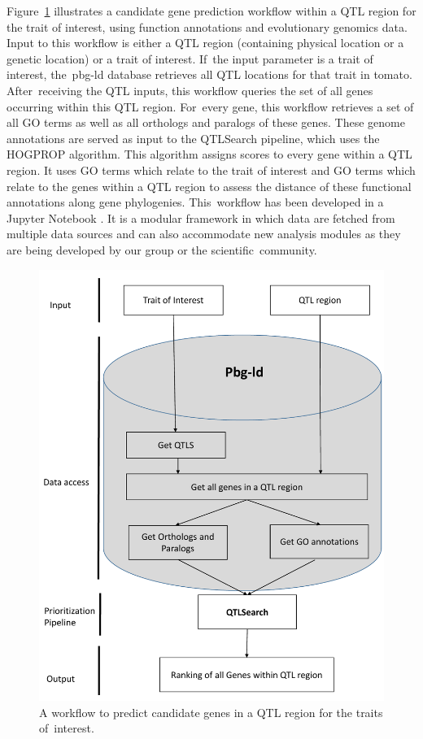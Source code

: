 \documentclass[applsci,article,accept,moreauthors,pdftex]{Definitions/mdpi}
\begin{document}
{Figure~\ref{Figure7} illustrates a candidate gene prediction workflow %
within a QTL region for the trait of interest, using function annotations and evolutionary genomics data. Input to this workflow is either a QTL region (containing physical location or a genetic location) or a trait of interest.
If~the input parameter is a trait of interest, the~pbg-ld %
database retrieves all QTL locations for that trait in tomato. After~receiving the QTL inputs, this workflow queries the set of all genes occurring within this QTL region.
For~every gene, this workflow retrieves a set of all GO terms as well as all orthologs and paralogs of these genes.
These genome annotations are served as input to the QTLSearch pipeline, %
which uses the HOGPROP algorithm. %
This algorithm %
assigns scores to every gene %
within a QTL region. It uses GO terms which relate to the trait of interest and GO terms which relate to the genes within a QTL region to assess the distance of these functional annotations along gene phylogenies. This~workflow has been developed in a Jupyter Notebook \cite{Notebooks}. %
It is a modular framework in which data are %
fetched from multiple data sources and can also accommodate new analysis modules as they are being developed by our group or the scientific~community.
\begin{figure}[H]
\centering
\includegraphics[scale=0.60]{Figure7.pdf}
\caption{A workflow to predict candidate genes in a QTL region for the traits of~interest.} \label{Figure7}
\end{figure}

}
\end{document}
